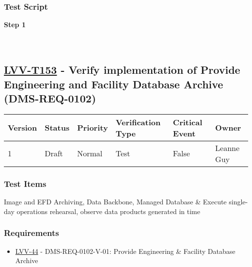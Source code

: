 \hypertarget{test-script-129}{%
\subsubsection{Test Script}\label{test-script-129}}

\textbf{Step 1}\\
~\\
~\\

\hypertarget{lvv-t153---verify-implementation-of-provide-engineering-and-facility-database-archive-dms-req-0102}{%
\subsection{\texorpdfstring{\href{https://jira.lsstcorp.org/secure/Tests.jspa\#/testCase/LVV-T153}{LVV-T153}
- Verify implementation of Provide Engineering and Facility Database
Archive
(DMS-REQ-0102)}{LVV-T153 - Verify implementation of Provide Engineering and Facility Database Archive (DMS-REQ-0102)}}\label{lvv-t153---verify-implementation-of-provide-engineering-and-facility-database-archive-dms-req-0102}}

\begin{longtable}[]{@{}llllll@{}}
\toprule
Version & Status & Priority & Verification Type & Critical Event &
Owner\tabularnewline
\midrule
\endhead
1 & Draft & Normal & Test & False & Leanne Guy\tabularnewline
\bottomrule
\end{longtable}

\hypertarget{test-items-129}{%
\subsubsection{Test Items}\label{test-items-129}}

Image and EFD Archiving, Data Backbone, Managed Database \& Execute
single-day operations rehearsal, observe data products generated in time

\hypertarget{requirements-130}{%
\subsubsection{Requirements}\label{requirements-130}}

\begin{itemize}
\tightlist
\item
  \href{https://jira.lsstcorp.org/browse/LVV-44}{LVV-44} -
  DMS-REQ-0102-V-01: Provide Engineering \& Facility Database Archive
\end{itemize}

